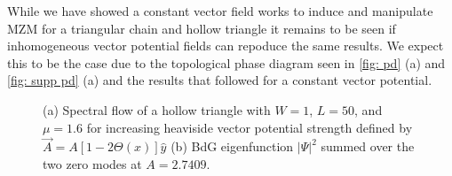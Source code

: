While we have showed a constant vector field works to induce and manipulate MZM for a triangular chain and hollow triangle it remains to be seen if inhomogeneous vector potential fields can repoduce the same results. We expect this to be the case due to the topological phase diagram seen in \ref{fig: pd} (a) and \ref{fig: supp pd} (a) and the results that followed for a constant vector potential.

\begin{figure}[!ht]
  \caption{(a) Spectral flow of a hollow triangle with $W=1$, $L=50$, and $\mu=1.6$ for increasing heaviside vector potential strength defined by $\vec{A} = A [1-2\Theta(x)] \hat{y}$ (b) BdG eigenfunction $|\Psi|^2$ summed over the two zero modes at $A = 2.7409$.}
  \label{fig: heaviside-increasing-w-1}
\end{figure}


